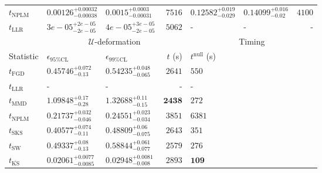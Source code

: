 \begin{tabular}{l|llr|llr}
\rowcolor{red!35}	$t_{\mathrm{NPLM}}$ & $0.00126_{-0.00038}^{+0.00032}$ & $0.0015_{-0.00031}^{+0.0003}$ & $7516$ & $0.12582_{-0.029}^{+0.019}$ & $0.14099_{-0.02}^{+0.016}$ & $4100$ \\
	$t_{\mathrm{LLR}}$ & $3e-05_{-2e-05}^{+2e-05}$ & $4e-05_{-2e-05}^{+3e-05}$ & $5062$ & - & - & - \\
	\toprule
	\multicolumn{1}{c}{} & \multicolumn{3}{c}{$\mathcal{U}$-deformation} & \multicolumn{3}{c}{Timing} \\
	Statistic & $\epsilon_{95\%\mathrm{CL}}$ & $\epsilon_{99\%\mathrm{CL}}$ & $t$ (s) & $t^{\mathrm{null}}$ (s) \\
	\midrule
	$t_{\mathrm{FGD}}$ & $0.45746_{-0.13}^{+0.072}$ & $0.54235_{-0.065}^{+0.048}$ & $2641$ & $550$ \\
	$t_{\mathrm{LLR}}$ & - & - & - & - \\
	$t_{\mathrm{MMD}}$ & $1.09848_{-0.28}^{+0.17}$ & $1.32688_{-0.15}^{+0.11}$ & ${\mathbf{2438}}$ & $272$ \\
\rowcolor{red!35}	$t_{\mathrm{NPLM}}$ & $0.21737_{-0.046}^{+0.032}$ & $0.24551_{-0.034}^{+0.023}$ & $3851$ & $6381$ \\
	$t_{\mathrm{SKS}}$ & $0.40577_{-0.11}^{+0.074}$ & $0.48809_{-0.075}^{+0.06}$ & $2643$ & $351$ \\
	$t_{\mathrm{SW}}$ & $0.49337_{-0.13}^{+0.08}$ & $0.58844_{-0.077}^{+0.061}$ & $2579$ & $276$ \\
	$t_{\overline{\mathrm{KS}}}$ & ${\mathbf{0.02061_{-0.0085}^{+0.0077}}}$ & ${\mathbf{0.02948_{-0.008}^{+0.0081}}}$ & $2893$ & ${\mathbf{109}}$ \\
	\bottomrule
\end{tabular}